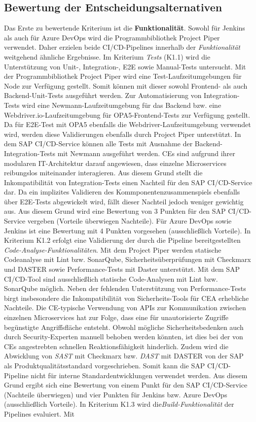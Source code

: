 \subsection{Bewertung der Entscheidungsalternativen}
Das Erste zu bewertende Kriterium ist die \textbf{Funktionalität}. Sowohl für Jenkins als auch für Azure DevOps wird die Programmbibliothek Project Piper verwendet. Daher erzielen beide CI/CD-Pipelines innerhalb der \textit{Funktionalität} weitgehend ähnliche Ergebnisse.
Im Kriterium \textit{Tests} (K1.1) wird die Unterstützung von Unit-, Integration-, E2E sowie Manual-Tests untersucht. Mit der Programmbibliothek Project Piper wird eine Test-Laufzeitumgebungen für Node zur Verfügung gestellt. Somit können mit dieser sowohl Frontend- als auch Backend-Unit-Tests ausgeführt werden. Zur Automatisierung von Integration-Tests wird eine Newmann-Laufzeitumgebung für das Backend bzw. eine Webdriver.io-Laufzeitumgebung für OPA5-Frontend-Tests zur Verfügung gestellt. Da für E2E-Test mit OPA5 ebenfalls die Webdriver-Laufzeitumgebung verwendet wird, werden diese Validierungen ebenfalls durch Project Piper unterstützt. In dem SAP CI/CD-Service können alle Tests mit Ausnahme der Backend-Integration-Tests mit Newmann ausgeführt werden. CEs sind aufgrund ihrer modularen IT-Architektur darauf angewiesen, dass einzelne Microservices reibungslos miteinander interagieren. Aus diesem Grund stellt die Inkompatibilität von Integration-Tests einen Nachteil für den SAP CI/CD-Service dar. Da ein implizites Validieren des Kommponentenzusammenspiels ebenfalls über E2E-Tests abgewickelt wird, fällt dieser Nachteil jedoch weniger gewichtig aus. Aus diesem Grund wird eine Bewertung von 3 Punkten für den SAP CI/CD-Service vergeben (Vorteile überwiegen Nachteile). Für Azure DevOps sowie Jenkins ist eine Bewertung mit 4 Punkten vorgesehen (ausschließlich Vorteile). In Kriterium K1.2 erfolgt eine Validierung der durch die Pipeline bereitgestellten \textit{Code-Analyse-Funktionalitäten}. Mit dem Project Piper werden statische Codeanalyse mit Lint bzw. SonarQube, Sicherheitsüberprüfungen mit Checkmarx und DASTER sowie Performance-Tests mit Daster unterstützt. Mit dem SAP CI/CD-Tool sind ausschließlich statische Code-Analysen mit Lint bzw. SonarQube möglich. Neben der fehlenden Unterstützung von Performance-Tests birgt insbesondere die Inkompatibilität von Sicherheits-Tools  für CEA erhebliche Nachteile. Die CE-typische Verwendung von APIs zur Kommunikation zwischen einzelnen Microservices hat zur Folge, dass eine für unautorisierte Zugriffe begünstigte Angriffsfläche entsteht. Obwohl mögliche Sicherheitsbedenken auch durch Security-Experten manuell behoben werden könnten, ist dies bei der von CEs angestrebten schnellen Reaktionsfähigkeit hinderlich. Zudem wird die Abwicklung von \textit{\ac{SAST}} mit Checkmarx bzw. \textit{\ac{DAST}} mit DASTER von der SAP als Produktqualitätsstandard vorgeschrieben. Somit kann die SAP CI/CD-Pipeline nicht für interne Standardentwicklungen verwendet werden. Aus diesem Grund ergibt sich eine Bewertung von einem Punkt für den SAP CI/CD-Service (Nachteile überwiegen) und vier Punkten für Jenkins bzw. Azure DevOps (ausschließlich Vorteile). In Kriterium K1.3 wird die\textit{Build-Funktionalität} der Pipelines evaluiert. Mit 